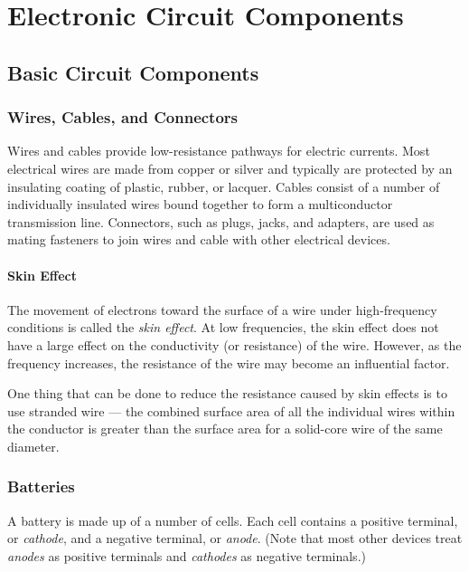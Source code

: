 \documentclass[../../document]{subfiles}
\begin{document}
\graphicspath{{images/}}

\chapter{Electronic Circuit Components}
\section{Basic Circuit Components}
\subsection{Wires, Cables, and Connectors}
Wires and cables provide low-resistance pathways for electric currents. Most
electrical wires are made from copper or silver and typically are protected
by an insulating coating of plastic, rubber, or lacquer. Cables consist of a
number of individually insulated wires bound together to form a
multiconductor transmission line. Connectors, such as plugs, jacks, and
adapters, are used as mating fasteners to join wires and cable with other
electrical devices. \cite{practical_electronics}

\subsubsection{Skin Effect}
The movement of electrons toward the surface of a wire under high-frequency
conditions is called the \emph{skin effect}. At low frequencies, the skin effect does
not have a large effect on the conductivity (or resistance) of the wire.
However, as the frequency increases, the resistance of the wire may become an
influential factor. \cite{practical_electronics}

One thing that can be done to reduce the resistance caused by skin effects is
to use stranded wire --- the combined surface area of all the individual wires
within the conductor is greater than the surface area for a solid-core wire
of the same diameter. \cite{practical_electronics}

\subsection{Batteries}
A battery is made up of a number of cells. Each cell contains a positive
terminal, or \emph{cathode}, and a negative terminal, or \emph{anode}. (Note
that most other devices treat \emph{anodes} as positive terminals and
\emph{cathodes} as negative terminals.) \cite{practical_electronics}
\end{document}
